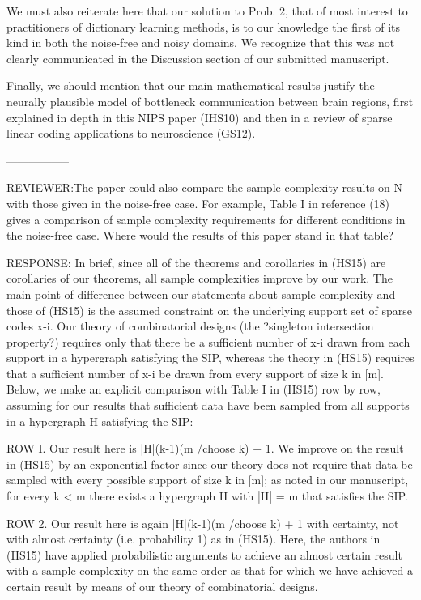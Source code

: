 We must also reiterate here that our solution to Prob. 2, that of most interest to practitioners of dictionary learning methods, is to our knowledge the first of its kind in both the noise-free and noisy domains. We recognize that this was not clearly communicated in the Discussion section of our submitted manuscript.

Finally, we should mention that our main mathematical results justify the neurally plausible model of bottleneck communication between brain regions, first explained in depth in this NIPS paper (IHS10) and then in a review of sparse linear coding applications to neuroscience (GS12).

-----------------

REVIEWER:The paper could also compare the sample complexity results on N with those given in the noise-free case. For example, Table I in reference (18) gives a comparison of sample complexity requirements for different conditions in the noise-free case. Where would the results of this paper stand in that table?


RESPONSE: In brief, since all of the theorems and corollaries in (HS15) are corollaries of our theorems, all sample complexities improve by our work. The main point of difference between our statements about sample complexity and those of (HS15) is the assumed constraint on the underlying support set of sparse codes x-i. Our theory of combinatorial designs (the ?singleton intersection property?) requires only that there be a sufficient number of x-i drawn from each support in a hypergraph satisfying the SIP, whereas the theory in (HS15) requires that a sufficient number of x-i be drawn from every support of size k in [m]. Below, we make an explicit comparison with Table I in (HS15) row by row, assuming for our results that sufficient data have been sampled from all supports in a hypergraph H satisfying the SIP:

ROW I. Our result here is |H|(k-1)(m /choose k) + 1. We improve on the result in (HS15) by an exponential factor since our theory does not require that data be sampled with every possible support of size k in [m]; as noted in our manuscript, for every k < m there exists a hypergraph H with |H| = m that satisfies the SIP. 

ROW 2. Our result here is again |H|(k-1)(m /choose k) + 1 with certainty, not with almost certainty (i.e. probability 1) as in (HS15). Here, the authors in (HS15) have applied probabilistic arguments to achieve an almost certain result with a sample complexity on the same order as that for which we have achieved a certain result by means of our theory of combinatorial designs.    

